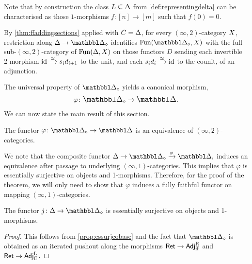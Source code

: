\documentclass[a4paper,reqno,twoside]{amsart}
\begin{document}
\begin{remark}\label{rem:Lintrinsinc}
	Note that by construction the class $\relax{L}\subseteq \Delta$ from \cref{def:representingdelta} can be characterised as those $1$-morphisms  $f \colon [n]\to [m]$ such that $f(0)=0$.
\end{remark}

\begin{remark}\label{rem:representingdelta}
	By \cref{thm:ffaddingsections} applied with $\relax{C}=\Delta$, for every $(\infty,2)$-category $\relax{X}$, restriction along $\Delta \to \ddelta_{\diamond}$ identifies $\Fun(\ddelta_{\diamond},\cX)$ with the full sub-$(\infty,2)$-category of $\mathrm{Fun}(\Delta,\relax{X})$ on those functors $D$ sending each invertible 2-morphism $\mathrm{id} \xrightarrow{\simeq} s_id_{i+1}$ to the unit, and each $s_id_i \xrightarrow{\simeq} \mathrm{id}$ to the counit, of an adjunction.
\end{remark}
The universal property of $\ddelta_{\diamond}$ yields a canonical morphism,
	\begin{equation}
		\varphi \colon \ddelta_{\diamond} \to \ddelta.
	\end{equation}
We can now state the main result of this section.
\begin{theorem}\label{thm:2simplex}
	The functor $\varphi \colon \ddelta_{\diamond} \to \ddelta$ is an equivalence of $(\infty,2)$-categories.
\end{theorem}


\begin{remark}\label{rem:redremark}
	We note that the composite functor $\Delta \to \ddelta_\diamond \xrightarrow{\varphi} \ddelta,$
induces an equivalence after passage to underlying $(\infty,1)$-categories. This implies that $\varphi$ is essentially surjective on objects and 1-morphisms. Therefore, for the proof of the theorem, we will only need to show that $\varphi$ induces a fully faithful functor on mapping $(\infty,1)$-categories.
\end{remark}

\begin{lemma}\label{lem:esssurj1morph}
	The functor $j \colon \Delta \to \ddelta_{\diamond}$ is essentially surjective on objects and 1-morphisms.
\end{lemma}
\begin{proof}
	This follows from \cref{prop:essurjcobase} and the fact that $\ddelta_{\diamond}$ is obtained as an iterated pushout along the morphisms $\mathsf{Ret} \to \mathsf{Adj}^{\operatorname{R}}_{\mathrm{ff}}$ and $\mathsf{Ret} \to \mathsf{Adj}^{\operatorname{L}}_{\mathrm{ff}}$.
\end{proof}
\end{document}
